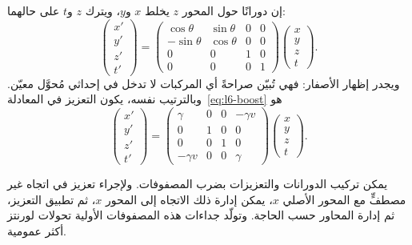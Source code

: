 إن دورانًا حول المحور \(z\) يخلط \(x\) و\(y\)، ويترك \(z\) و\(t\) على حالهما: \begin{equation}
\begin{pmatrix}
  x'\\ y'\\ z'\\ t'
\end{pmatrix}
=
\begin{pmatrix}
  \cos\theta & \sin\theta & 0 & 0\\
  -\sin\theta & \cos\theta & 0 & 0\\
  0 & 0 & 1 & 0\\
  0 & 0 & 0 & 1
\end{pmatrix}
\begin{pmatrix}
  x\\ y\\ z\\ t
\end{pmatrix}.
\end{equation} ويجدر إظهار الأصفار: فهي تُبيّن صراحةً أي المركبات لا تدخل في إحداثي مُحوَّل معيّن. وبالترتيب نفسه، يكون التعزيز في المعادلة~\eqref{eq:l6-boost} هو \begin{equation}
\begin{pmatrix}
  x'\\ y'\\ z'\\ t'
\end{pmatrix}
=
\begin{pmatrix}
  \gamma & 0 & 0 & -\gamma v\\
  0 & 1 & 0 & 0\\
  0 & 0 & 1 & 0\\
  -\gamma v & 0 & 0 & \gamma
\end{pmatrix}
\begin{pmatrix}
  x\\ y\\ z\\ t
\end{pmatrix}.
\end{equation}

يمكن تركيب الدورانات والتعزيزات بضرب المصفوفات. ولإجراء تعزيز في اتجاه غير مصطفٍّ مع المحور الأصلي \(x\)، يمكن إدارة ذلك الاتجاه إلى المحور \(x\)، ثم تطبيق التعزيز، ثم إدارة المحاور حسب الحاجة. وتولّد جداءات هذه المصفوفات الأولية تحولات لورنتز أكثر عمومية.

\begin{classroomqa}   \end{classroomqa}

